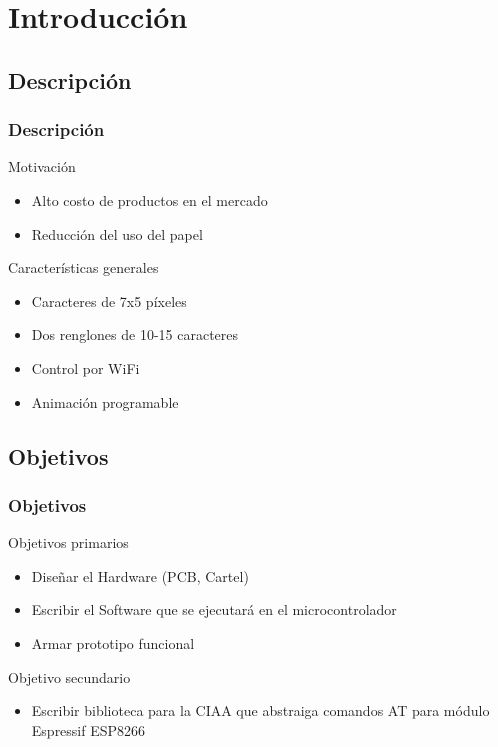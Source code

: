 \section{Introducción} 

\subsection{Descripción}
 

\begin{frame}
	\frametitle{Descripción}
	
		\begin{block}{Motivación}
			\begin{itemize}
				\item Alto costo de productos en el mercado
				\item Reducción del uso del papel
			\end{itemize}
		\end{block}

		\begin{block}{Características generales}
			\begin{itemize}
				\item Caracteres de 7x5 píxeles
				\item Dos renglones de 10-15 caracteres
				\item Control por WiFi
				\item Animación programable
			\end{itemize}
		\end{block}

\end{frame}

\subsection{Objetivos}
\begin{frame}
	\frametitle{Objetivos}
	\begin{block}{Objetivos primarios}
		\begin{itemize}
			\item Diseñar el Hardware (PCB, Cartel)
			\item Escribir el Software que se ejecutará en el microcontrolador
			\item Armar prototipo funcional
		\end{itemize}
	\end{block}
	
	\begin{block}{Objetivo secundario}
		\begin{itemize}
			\item Escribir biblioteca para la CIAA que abstraiga comandos AT para módulo Espressif ESP8266
		\end{itemize}
	\end{block}
\end{frame}

